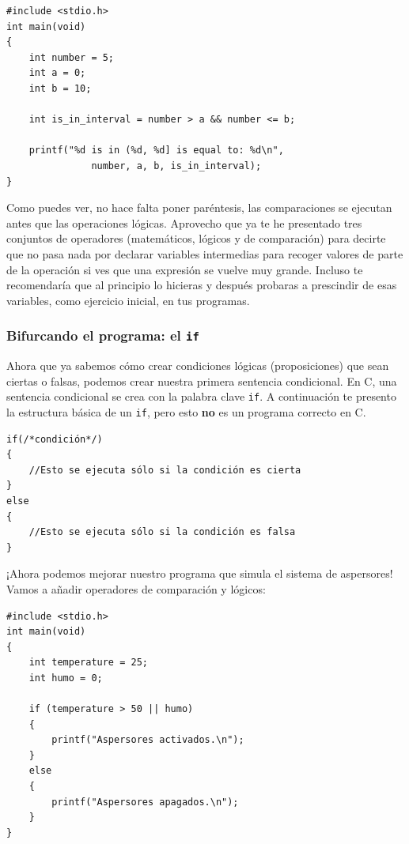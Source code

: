 \documentclass[a4paper]{article}
\begin{document}
\noindent
\begin{minipage}[H]{\linewidth}
\mbox{}
\begin{lstlisting}[style=C,
caption={Primer programa con operaciones de comparación},
label={lst:firstComparingProgram}]
#include <stdio.h>
int main(void)
{
    int number = 5;
    int a = 0;
    int b = 10;

    int is_in_interval = number > a && number <= b;

    printf("%d is in (%d, %d] is equal to: %d\n",
               number, a, b, is_in_interval);
}
\end{lstlisting}
\end{minipage}


Como puedes ver, no hace falta poner paréntesis, las comparaciones se ejecutan
antes que las operaciones lógicas. Aprovecho que ya te he presentado tres
conjuntos de operadores (matemáticos, lógicos y de comparación) para decirte
que no pasa nada por declarar variables intermedias para recoger valores de
parte de la operación si ves que una expresión se vuelve muy grande. Incluso
te recomendaría que al principio lo hicieras y después probaras a prescindir de
esas variables, como ejercicio inicial, en tus programas.

\subsubsection{Bifurcando el programa: el \texttt{if}}
Ahora que ya sabemos cómo crear condiciones lógicas (proposiciones) que sean
ciertas o falsas, podemos crear nuestra primera sentencia condicional. En C,
una sentencia condicional se crea con la palabra clave \lstinline!if!. A
continuación te presento la estructura básica de un \texttt{if}, pero esto
\textbf{no} es un programa correcto en C.


\noindent
\begin{minipage}[H]{\linewidth}
\mbox{}
\begin{lstlisting}[style=C,
caption={Esquema básico de instrucción \texttt{if}},
label={lst:ifStructure}]
if(/*condición*/)
{
    //Esto se ejecuta sólo si la condición es cierta
}
else
{
    //Esto se ejecuta sólo si la condición es falsa
}
\end{lstlisting}
\end{minipage}


¡Ahora podemos mejorar nuestro programa que simula el sistema de aspersores!
Vamos a añadir operadores de comparación y lógicos:


\noindent
\begin{minipage}[H]{\linewidth}
\mbox{}
\begin{lstlisting}[style=C,
caption={Programa del aspersor con operadores lógicos y de comparación},
label={lst:sprinklerLogicComp}]
#include <stdio.h>
int main(void)
{
    int temperature = 25;
    int humo = 0;

    if (temperature > 50 || humo)
    {
        printf("Aspersores activados.\n");
    }
    else
    {
        printf("Aspersores apagados.\n");
    }
}
\end{lstlisting}
\end{minipage}
\end{document}
